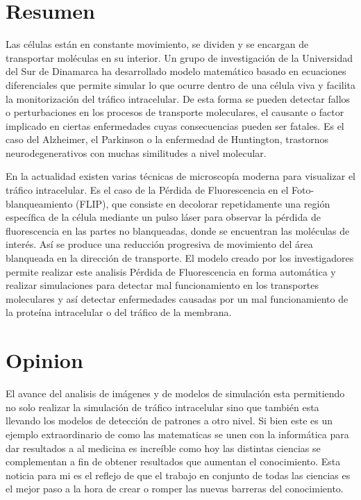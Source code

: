 \documentclass[12pt,letterpaper]{article}
\begin{document}
\section*{\centering Resumen}
Las células están en constante movimiento, se dividen y se encargan de transportar moléculas en su interior. Un grupo de investigación de la Universidad del Sur de Dinamarca ha desarrollado modelo matemático\autocite{web:1} basado en ecuaciones diferenciales que permite simular lo que ocurre dentro de una célula viva y facilita la monitorización del tráfico intracelular.
De esta forma se pueden detectar fallos o perturbaciones en los procesos de transporte moleculares, el causante o factor implicado en ciertas enfermedades cuyas consecuencias pueden ser fatales. Es el caso del Alzheimer, el Parkinson o la enfermedad de Huntington, trastornos neurodegenerativos con muchas similitudes a nivel molecular.

En la actualidad existen varias técnicas de microscopía moderna para visualizar el tráfico intracelular. Es el caso de la Pérdida de Fluorescencia en el Foto-blanqueamiento (FLIP), que consiste en decolorar repetidamente una región específica de la célula mediante un pulso láser para observar la pérdida de fluorescencia en las partes no blanqueadas, donde se encuentran las moléculas de interés. Así se produce una reducción progresiva de movimiento del área blanqueada en la dirección de transporte.
El modelo creado por los investigadores permite realizar este analisis Pérdida de Fluorescencia en forma automática y realizar simulaciones para detectar mal funcionamiento en los transportes moleculares y así detectar enfermedades causadas por un mal funcionamiento de la proteína intracelular o del tráfico de la membrana.


\section{Opinion}
El avance del analisis de imágenes y de modelos de simulación esta permitiendo no solo realizar la simulación de tráfico intracelular sino que también esta llevando los modelos de detección de patrones a otro nivel. Si bien este es un ejemplo extraordinario de como las matematicas se unen con la informática para dar resultados a al medicina es increíble como hoy las distintas ciencias se complementan a fin de obtener resultados que aumentan el conocimiento.
Esta noticia para mi es el reflejo de que el trabajo en conjunto de todas las ciencias es el mejor paso a la hora de crear o romper las nuevas barreras del conocimiento.
\end{document}
